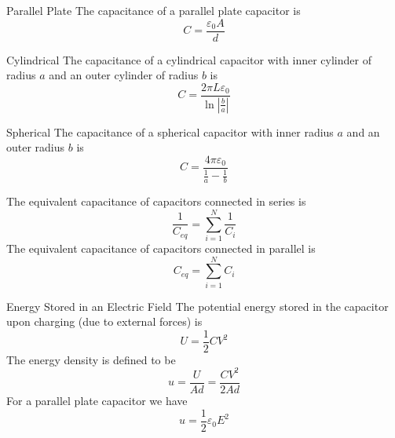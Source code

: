 \documentclass[12pt]{report}
\begin{document}
\begin{prop}{Parallel Plate}{}
        The capacitance of a parallel plate capacitor is \begin{equation}
                C = \frac{\varepsilon_0 A}{d}
        \end{equation}
\end{prop}

\begin{prop}{Cylindrical}{}
        The capacitance of a cylindrical capacitor with inner cylinder of radius $a$ and an outer cylinder of radius $b$ is \begin{equation}
                C = \frac{2\pi L\varepsilon_0}{\ln\left|\frac{b}{a}\right|}
        \end{equation}
\end{prop}


\begin{prop}{Spherical}{}
        The capacitance of a spherical capacitor with inner radius $a$ and an outer radius $b$ is \begin{equation}
                C = \frac{4\pi \varepsilon_0}{\frac{1}{a} - \frac{1}{b}}
        \end{equation}
\end{prop}


\begin{thm}{}{}
        The equivalent capacitance of capacitors connected in series is \begin{equation}
                \frac{1}{C_{eq}} = \sum_{i=1}^N\frac{1}{C_i}
        \end{equation}
        The equivalent capacitance of capacitors connected in parallel is \begin{equation}
                C_{eq} = \sum_{i=1}^NC_i
        \end{equation}
\end{thm}



\begin{defn}{Energy Stored in an Electric Field}{}
        The potential energy stored in the capacitor upon charging (due to external forces) is \begin{equation}
                U = \frac{1}{2}CV^2
        \end{equation}
        The energy density is defined to be \begin{equation}
                u = \frac{U}{Ad} = \frac{CV^2}{2Ad}
        \end{equation}
        For a parallel plate capacitor we have \begin{equation}
                u = \frac{1}{2}\varepsilon_0 E^2
        \end{equation}
\end{defn}
\end{document}
